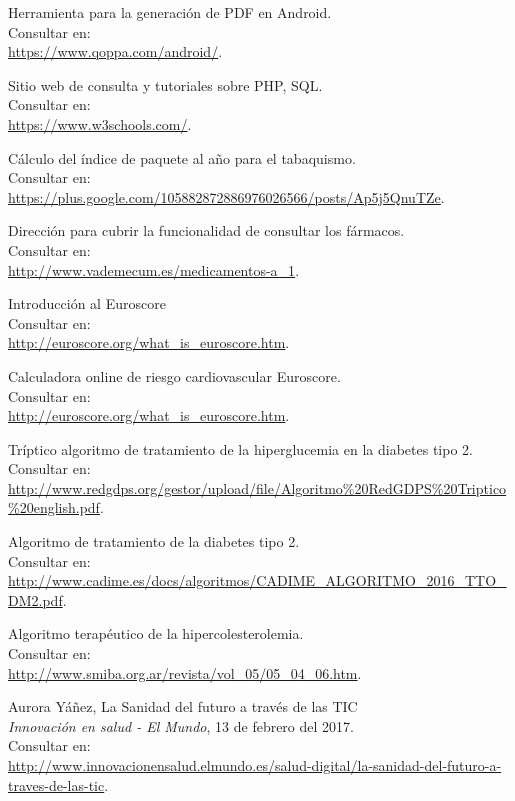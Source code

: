 \documentclass[11pt,spanish,
		listoftables,listoffigures]
		{tfgplantilla}
\begin{document}
\begin{thebibliography}{10}
   Herramienta para la generación de PDF en Android.\\
   \newblock Consultar en:\\
   \url{ https://www.qoppa.com/android/}.

   Sitio web de consulta y tutoriales sobre PHP, SQL.\\
   \newblock Consultar en:\\
   \url{ https://www.w3schools.com/}.

   Cálculo del índice de paquete al año para el tabaquismo.\\
   \newblock Consultar en:\\
   \url{ https://plus.google.com/105882872886976026566/posts/Ap5j5QnuTZe}.

   Dirección para cubrir la funcionalidad de consultar los fármacos.\\
   \newblock Consultar en:\\
   \url{ http://www.vademecum.es/medicamentos-a_1}.

   Introducción al Euroscore\\
   \newblock Consultar en:\\
   \url{ http://euroscore.org/what_is_euroscore.htm}.

   Calculadora online de riesgo cardiovascular Euroscore.\\
   \newblock Consultar en:\\
   \url{ http://euroscore.org/what_is_euroscore.htm}.

   Tríptico algoritmo de tratamiento de la hiperglucemia en la diabetes tipo 2.\\
   \newblock Consultar en:\\
   \url{ http://www.redgdps.org/gestor/upload/file/Algoritmo\%20RedGDPS\%20Triptico\%20english.pdf}.

   Algoritmo de tratamiento de la diabetes tipo 2.\\
   \newblock Consultar en:\\
   \url{ http://www.cadime.es/docs/algoritmos/CADIME_ALGORITMO_2016_TTO_DM2.pdf}.

   Algoritmo terapéutico de la hipercolesterolemia.\\
   \newblock Consultar en:\\
   \url{ http://www.smiba.org.ar/revista/vol_05/05_04_06.htm}.

   Aurora Yáñez, 
   \newblock La Sanidad del futuro a través de las TIC \\
   \newblock \textit{Innovación en salud - El Mundo}, 13 de febrero del 2017.\\
   \newblock Consultar en:\\
   \url{ http://www.innovacionensalud.elmundo.es/salud-digital/la-sanidad-del-futuro-a-traves-de-las-tic}.


\end{thebibliography}
\end{document}
